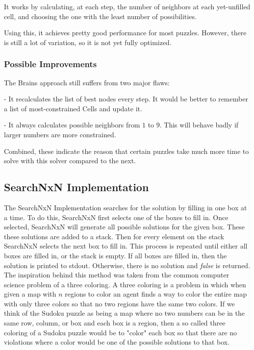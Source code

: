 \documentclass[letterpaper]{article}
\begin{document}
It works by calculating, at each step, the number of neighbors at each
yet-unfilled cell, and choosing the one with the least number of
possibilities.

Using this, it achieves pretty good performance for most puzzles. However,
there is still a lot of variation, so it is not yet fully optimized.

\subsubsection{Possible Improvements}
The Brains approach still suffers from two major flaws:

    - It recalculates the list of best nodes every step. It would be better
    to remember a list of most-constrained Cells and update it.

    - It always calculates possible neighbors from $ 1 $ to $ 9 $.
    This will behave badly if larger numbers are more constrained.

Combined, these indicate the reason that certain puzzles take much more
time to solve with this solver compared to the next.


\subsection{SearchNxN Implementation}

The SearchNxN Implementation searches for the solution by filling in one box at a time. To do this, SearchNxN first selects one of the boxes to fill in. Once selected, SearchNxN will generate all possible solutions for the given box. These these solutions are added to a stack. Then for every element on the stack SearchNxN selects the next box to fill in. This process is repeated until either all boxes are filled in, or the stack is empty. If all boxes are filled in, then the solution is printed to stdout. Otherwise, there is no solution and \emph{false} is returned. The inspiration behind this method was taken from the common computer science problem of a three coloring. A three coloring is a problem in which when given a map with $n$ regions to color an agent finds a way to color the entire map with only three colors so that no two regions have the same two colors. If we think of the Sudoku puzzle as being a map where no two numbers can be in the same row, column, or box and each box is a region, then a so called three coloring of a Sudoku puzzle would be to "color" each box so that there are no violations where a color would be one of the possible solutions to that box.
\end{document}
